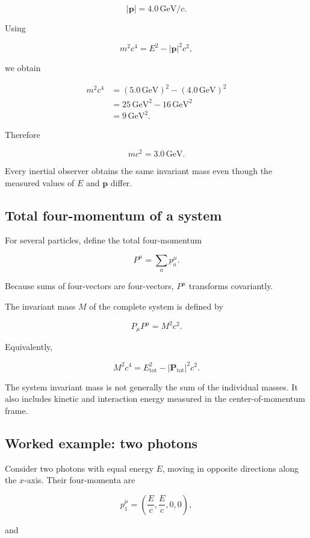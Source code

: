 \[
|\mathbf{p}|=4.0\,\mathrm{GeV}/c.
\]

Using

\[
m^{2}c^{4}
=
E^{2}-|\mathbf{p}|^{2}c^{2},
\]

we obtain

\[
\begin{aligned}
m^{2}c^{4}
&=
(5.0\,\mathrm{GeV})^{2}
-
(4.0\,\mathrm{GeV})^{2}\\
&=
25\,\mathrm{GeV}^{2}
-
16\,\mathrm{GeV}^{2}\\
&=
9\,\mathrm{GeV}^{2}.
\end{aligned}
\]

Therefore

\[
\boxed{
mc^{2}=3.0\,\mathrm{GeV}
}.
\]

Every inertial observer obtains the same invariant mass even though the measured values of \(E\) and \(\mathbf{p}\) differ.

\subsection{Total four-momentum of a system}

For several particles, define the total four-momentum

\[
\boxed{
P^{\mu}
=
\sum_{a}p_{a}^{\mu}
}.
\]

Because sums of four-vectors are four-vectors, \(P^{\mu}\) transforms covariantly.

The invariant mass \(M\) of the complete system is defined by

\[
\boxed{
P_{\mu}P^{\mu}=M^{2}c^{2}
}.
\]

Equivalently,

\[
\boxed{
M^{2}c^{4}
=
E_{\mathrm{tot}}^{2}
-
|\mathbf{P}_{\mathrm{tot}}|^{2}c^{2}
}.
\]

The system invariant mass is not generally the sum of the individual masses. It also includes kinetic and interaction energy measured in the center-of-momentum frame.

\subsection{Worked example: two photons}

Consider two photons with equal energy \(E\), moving in opposite directions along the \(x\)-axis. Their four-momenta are

\[
p_{1}^{\mu}
=
\left(
\frac{E}{c},
\frac{E}{c},0,0
\right),
\]

and


